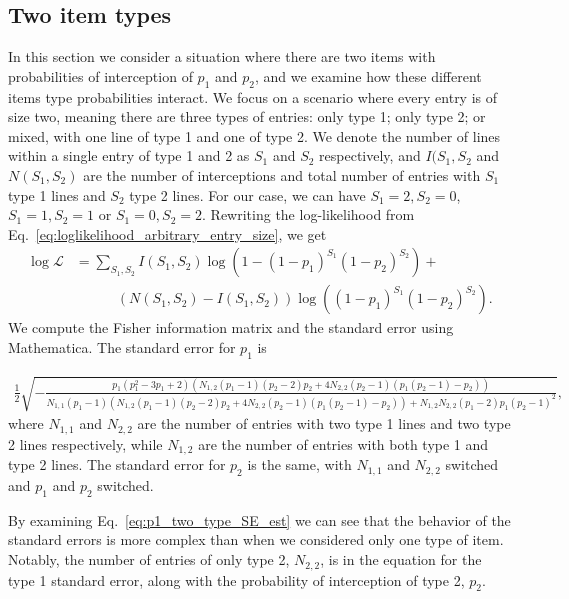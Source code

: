 \documentclass{article}
\begin{document}
\subsection{Two item types}
In this section we consider a situation where there are two items with probabilities of interception of \(p_1\) and \(p_2\), and we examine how these different items type probabilities interact. We focus on a scenario where every entry is of size two, meaning there are three types of entries: only type 1; only type 2; or mixed, with one line of type 1 and one of  type 2. We denote the number of lines within a single entry of type 1 and 2 as \(S_1\) and \(S_2\) respectively, and \(I(S_1,S_2\) and \(N(S_1,S_2)\) are the number of interceptions and total number of entries with \(S_1\) type 1 lines and \(S_2\) type 2 lines. For our case, we can have \(S_1=2, S_2=0\), \(S_1=1, S_2=1\) or \(S_1=0, S_2=2\). Rewriting the log-likelihood from Eq.~\eqref{eq:loglikelihood_arbitrary_entry_size}, we get
\begin{align}
\log\mathcal{L} &= \sum_{S_1,S_2}{I(S_1,S_2)}\log\left(1-(1-p_1)^{S_1}(1-p_2)^{S_2}\right) + \\ &\quad\quad\quad \left(N(S_1,S_2)-I(S_1,S_2)\right)\log\left((1-p_1)^{S_1}(1-p_2)^{S_2}\right). \label{eq:entry_mode_loglike_2types}
\end{align}
We compute the Fisher information matrix and the standard error using Mathematica. The standard error for \(p_1\) is

\begin{align}
\frac{1}{2} \sqrt{-\frac{{p_1} \left(p_1^2-3 p_1+2\right) (N_{1,2} (p_1-1) (p_2-2) p_2+4 N_{2,2} (p_2-1) (p_1 (p_2-1)-p_2))}{N_{1,1} (p_1-1) (N_{1,2} (p_1-1) (p_2-2) p_2+4 N_{2,2} (p_2-1) (p_1 (p_2-1)-p_2))+N_{1,2} N_{2,2} (p_1-2) p_1 (p_2-1)^2}},\label{eq:p1_two_type_SE_est}
\end{align}
where \(N_{1,1}\) and \(N_{2,2}\) are the number of entries with two type 1 lines and two type 2 lines respectively, while \(N_{1,2}\) are the number of entries with both type 1 and type 2 lines. The standard error for \(p_2\) is the same, with \(N_{1,1}\) and \(N_{2,2}\) switched and \(p_1\) and \(p_2\) switched. 

By examining Eq.~\eqref{eq:p1_two_type_SE_est} we can see that the behavior of the standard errors is more complex than when we considered only one type of item. Notably, the number of entries of only type 2, \(N_{2,2}\), is in the equation for the type 1 standard error, along with the probability of interception of type 2, \(p_2\). 
\end{document}
